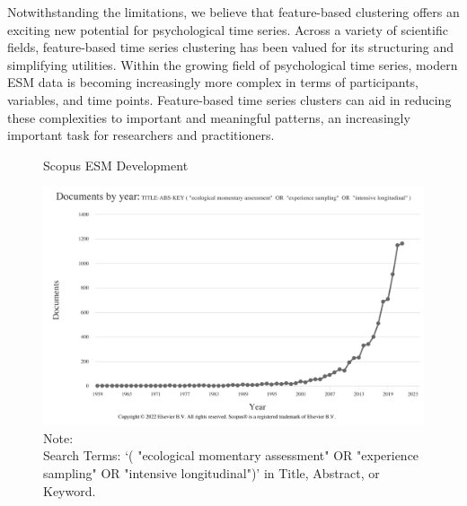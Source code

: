 \documentclass[man, 12pt, a4paper, mask]{apa7}
\theoremstyle{break}
\theoremstyle{plain}
\begin{document}
Notwithstanding the limitations, we believe that feature-based clustering offers an exciting new potential for psychological time series. Across a variety of scientific fields, feature-based time series clustering has been valued for its structuring and simplifying utilities. Within the growing field of psychological time series, modern ESM data is becoming increasingly more complex in terms of participants, variables, and time points. Feature-based time series clusters can aid in reducing these complexities to important and meaningful patterns, an increasingly important task for researchers and practitioners. 



%



\begin{figure}[hbtp]
  \caption{Scopus ESM Development}
  \label{fig:ScopusEsm}
  \centering\includegraphics[width=\textwidth]{figures/Scopus-ESM-Development.png}
  \caption*{Note: \\
  Search Terms: `( "ecological momentary assessment"  OR  "experience sampling"  OR  "intensive longitudinal")' in Title, Abstract, or Keyword.}
\end{figure}
\end{document}
